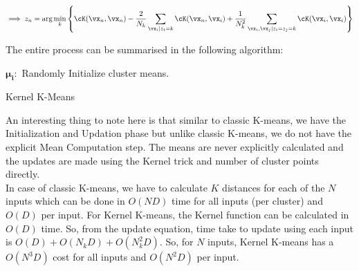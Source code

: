 \documentclass[a4paper,11pt]{article}
\begin{document}
\begin{mlsolution}
\begin{equation*}
    \implies z_n = \text{arg}\min\limits_k \bc{\cK(\vx_n,\vx_n) - \frac{2}{N_k}\sum\limits_{\vx_i | z_i=k} \cK(\vx_n, \vx_i) + \frac{1}{N_k^2}\sum\limits_{\vx_i, \vx_j | z_i=z_j=k}\cK(\vx_i, \vx_i)}
\end{equation*}

\pagebreak
The entire process can be summarised in the following algorithm:
\begin{algorithm}
    \DontPrintSemicolon
    \SetAlgoLined
    $\pmb{\mu_i} :$ Randomly Initialize cluster means.
    \caption{Kernel K-Means}
\end{algorithm}

An interesting thing to note here is that similar to classic K-means, we have the Initialization and Updation phase but unlike classic K-means, we do not have the explicit Mean Computation step. The means are never explicitly calculated and the updates are made using the Kernel trick and number of cluster points directly. \\

In case of classic K-means, we have to calculate $K$ distances for each of the $N$ inputs which can be done in $O(ND)$ time for all inputs (per cluster) and $O(D)$ per input.
For Kernel K-means, the Kernel function can be calculated in $O(D)$ time. So, from the update equation, time take to update using each input is $O(D) + O(N_kD) + O(N_k^2D)$. So, for $N$ inputs, Kernel K-means has a $O(N^3D)$ cost for all inputs and $O(N^2D)$ per input.

\end{mlsolution}
\end{document}

